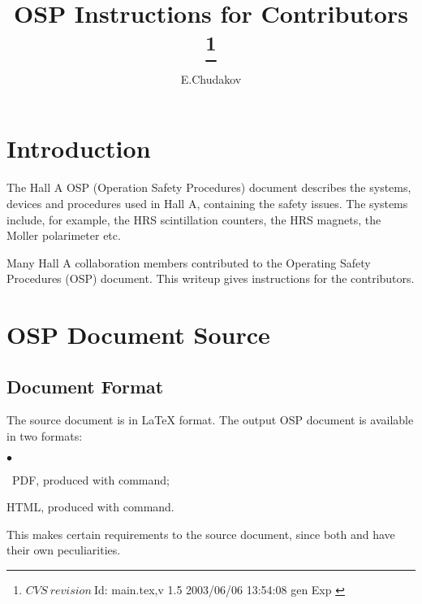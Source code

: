 \documentclass[12pt,letterpaper]{article}
\begin{document}
\color{\Mcol}
\pagestyle{headings}

\begin{titlepage}
\title{{\bf OSP Instructions for Contributors
\thanks{
 $CVS~revision~ $Id: main.tex,v 1.5 2003/06/06 13:54:08 gen Exp $ $
}
}}

\author{E.Chudakov} 
\setcounter{tocdepth}{3}
\end{titlepage} 
\maketitle 
 
\tableofcontents



\section{Introduction}
\label{sec:intro}

  The Hall A\cite{Hallawww} OSP (Operation Safety Procedures) document describes  
  the systems, devices and procedures used in Hall A, containing
  the safety issues. The systems include, for example, the HRS
  scintillation counters, the HRS magnets, the Moller polarimeter
  etc. 

  Many Hall A collaboration members contributed to the Operating Safety 
  Procedures (OSP) document. This writeup gives instructions for the
  contributors\cite{OSPgen}.

\section{OSP Document Source}
\label{sec:document}
   
\subsection{Document Format}
\label{sec:format}   

  The source document is in \LaTeX{} format.
  The output OSP document is available in two formats: 
  \begin{list}{$\bullet$}{\setlength{\itemsep}{-0.15cm}}
    \item ~PDF, produced with  command; 
    \item HTML, produced with  command. 
  \end{list}
  This makes certain requirements to the source document,
  since both  and  have their own
  peculiarities.
\end{document}
